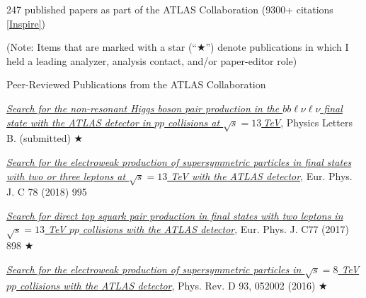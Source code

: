 \begin{minipage}{0.8\textwidth}
\begin{minipage}{\textwidth}
\vspace{0.15in}
\hspace{0.25in}\begin{minipage}{0.8\textwidth}

247 published papers as part of the ATLAS Collaboration (9300+ citations \href{https://inspirehep.net/author/profile/D.J.Antrim.1}{[Inspire]})

\vspace{0.15in}
(Note: Items that are marked with a star (``$\bigstar$'') denote publications in which I held a leading analyzer, analysis contact, and/or paper-editor role)


\vspace{0.15in}
\hspace{0.2in}Peer-Reviewed Publications from the ATLAS Collaboration

\hspace{0.35in}\begin{minipage}{1.0\textwidth}

\vspace{0.15in}
\href{https://arxiv.org/abs/1908.06765}{\textit{Search for the non-resonant Higgs boson pair production in the $bb\ell\nu\ell\nu$ final state with the ATLAS detector in $pp$ collisions at $\sqrt{s} = 13$\,TeV}}, Physics Letters B. (submitted) $\bigstar$

\vspace{0.15in}
\href{https://arxiv.org/abs/1803.02762}{\textit{Search for the electroweak production of supersymmetric particles in final states with
two or three leptons at $\sqrt{s} = 13$ TeV with the ATLAS detector}}, Eur. Phys. J. C 78 (2018) 995

\vspace{0.15in}
\href{https://arxiv.org/abs/1708.03247}{\textit{Search for direct top squark pair production in final states with two leptons
in $\sqrt{s} = 13$ TeV $pp$ collisions with the ATLAS detector}}, Eur. Phys. J. C77 (2017) 898 $\bigstar$

\vspace{0.15in}
\href{https://arxiv.org/abs/1509.07152}{\textit{Search for the electroweak production of supersymmetric particles in
$\sqrt{s} = 8$ TeV $pp$ collisions with the ATLAS detector}}, Phys. Rev. D 93, 052002 (2016) $\bigstar$


\end{minipage}


\end{minipage}
\end{minipage}
\end{minipage}
